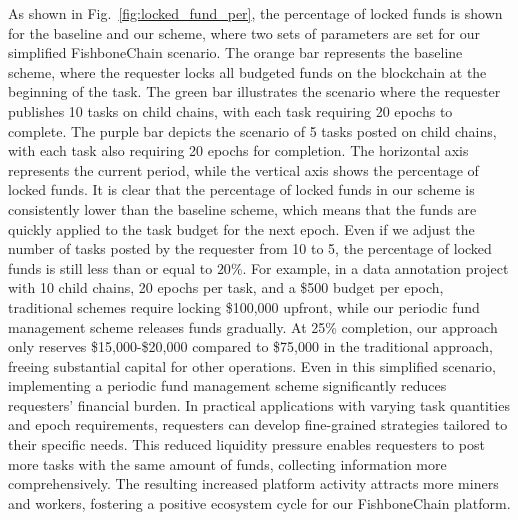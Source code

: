 \documentclass[10pt,journal]{IEEEtran}
\begin{document}
As shown in Fig.~\ref{fig:locked_fund_per}, the percentage of locked funds is shown for the baseline and our scheme, where two sets of parameters are set for our simplified FishboneChain scenario. The orange bar represents the baseline scheme, where the requester locks all budgeted funds on the blockchain at the beginning of the task. The green bar illustrates the scenario where the requester publishes 10 tasks on child chains, with each task requiring 20 epochs to complete. The purple bar depicts the scenario of 5 tasks posted on child chains, with each task also requiring 20 epochs for completion. The horizontal axis represents the current period, while the vertical axis shows the percentage of locked funds. It is clear that the percentage of locked funds in our scheme is consistently lower than the baseline scheme, which means that the funds are quickly applied to the task budget for the next epoch. Even if we adjust the number of tasks posted by the requester from 10 to 5, the percentage of locked funds is still less than or equal to $20 \%$. For example, in a data annotation project with 10 child chains, 20 epochs per task, and a \$500 budget per epoch, traditional schemes require locking \$100,000 upfront, while our periodic fund management scheme releases funds gradually. At 25\% completion, our approach only reserves \$15,000-\$20,000 compared to \$75,000 in the traditional approach, freeing substantial capital for other operations. Even in this simplified scenario, implementing a periodic fund management scheme significantly reduces requesters' financial burden. In practical applications with varying task quantities and epoch requirements, requesters can develop fine-grained strategies tailored to their specific needs. This reduced liquidity pressure enables requesters to post more tasks with the same amount of funds, collecting information more comprehensively. The resulting increased platform activity attracts more miners and workers, fostering a positive ecosystem cycle for our FishboneChain platform.
\end{document}
